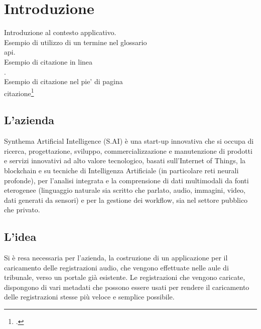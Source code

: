 

\chapter{Introduzione}
\label{cap:introduzione}

Introduzione al contesto applicativo.\\

\noindent Esempio di utilizzo di un termine nel glossario \\
\gls{api}. \\

\noindent Esempio di citazione in linea \\
\cite{site:agile-manifesto}. \\

\noindent Esempio di citazione nel pie' di pagina \\
citazione\footcite{womak:lean-thinking} \\

\section{L'azienda}
Synthema Artificial Intelligence (S.AI) è una start-up innovativa che si occupa di ricerca, progettazione, sviluppo, commercializzazione e manutenzione di prodotti e servizi innovativi ad alto valore tecnologico, basati sull'Internet of Things, la blockchain e su tecniche di Intelligenza Artificiale (in particolare reti neurali profonde), per l'analisi integrata e la comprensione di dati multimodali da fonti eterogenee (linguaggio naturale sia scritto che parlato, audio, immagini, video, dati generati da sensori) e per la gestione dei workflow, sia nel settore pubblico che privato.

\section{L'idea}

Si è resa necessaria per l'azienda, la costruzione di un applicazione per il caricamento delle registrazioni audio, che vengono effettuate nelle aule di tribunale, verso un portale già esistente. Le registrazioni che vengono caricate, dispongono di vari metadati che possono essere usati per rendere il caricamento delle registrazioni stesse più veloce e semplice possibile.

